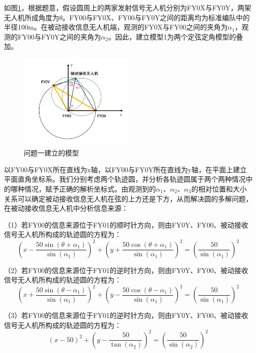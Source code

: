 \documentclass{my_paper}
\begin{document}
如图\ref{moxing1}，根据题意，假设圆周上的两家发射信号无人机分别为FY0X与FY0Y，两架无人机所成角度为$\theta$。FY00与FY0X、FY00与FY0Y之间的距离均为标准编队中的半径100m。在被动接收信息无人机端，观测的FY0X与FY00之间的夹角为$\alpha_1$，观测的FY00与FY0Y之间的夹角为$\alpha_2$。因此，建立模型1为两个定弦定角模型的叠加。



\begin{figure}[h]
    \centering
    \includegraphics[width=0.5\textwidth]{yuan.jpg}
    \caption{问题一建立的模型}
    \label{moxing1}
\end{figure}

以FY00与FY0X所在直线为x轴，以FY00与FY0Y所在直线为y轴，在平面上建立平面直角坐标系。我们分别考虑两个轨迹圆，并分析各轨迹圆属于两个两种情况中的哪种情况，赋予正确的解析坐标式。由观测到的$\alpha_1$、$\alpha_2$、$\alpha_3$的相对位置和大小关系可以确定被动接收信息无人机在弦的上方还是下方，从而解决圆的多解问题，在被动接收信息无人机中分析信息来源：

（1）若FY00的信息来源位于FY01的顺时针方向，则由FY0Y、FY00、被动接收信号无人机所构成的轨迹圆的方程为：
\begin{equation}
    (x - \frac{50\sin(\theta + \alpha_1)}{\sin(\alpha_1)})^2 + (y + \frac{50\cos(\theta + \alpha_1)}{\sin(\alpha_1)})^2 = (\frac{50}{\sin(\alpha_1)}) ^ 2
    \label{yuan1}
\end{equation}

（2）若FY00的信息来源位于FY01的逆时针方向，则由FY0Y、FY00、被动接收信号无人机所构成的轨迹圆的方程为：
\begin{equation}
    (x + \frac{50\sin(\theta - \alpha_1)}{\sin(\alpha_1)})^2 + (y - \frac{50\cos(\theta - \alpha_1)}{\sin(\alpha_1)})^2 = (\frac{50}{\sin(\alpha_1)}) ^ 2
    \label{yuan2}
\end{equation}

（3）若FY00的信息来源位于FY01的逆时针方向，则由FY0Y、FY00、被动接收信号无人机所构成的轨迹圆的方程为：
\begin{equation}
    (x - 50) ^{2} + (y - \frac{50}{\tan(\alpha_{2})}) ^ {2} = (\frac{50}{\sin(\alpha_2)}) ^ 2
    \label{yuan3}
\end{equation}
\end{document}
